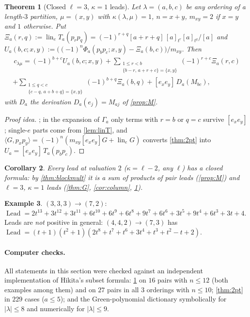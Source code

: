 \documentclass[submission]{FPSAC2027}
\newtheorem{theorem}{Theorem}[section]
\newtheorem{corollary}[theorem]{Corollary}
\theoremstyle{definition}
\newtheorem{example}[theorem]{Example}
\theoremstyle{remark}
\newcommand{\lin}{\operatorname{lin}_e}
\newcommand{\Lead}{\operatorname{Lead}}
\begin{document}
\begin{theorem}[Closed $\ell=3$, $\kappa=1$ leads]\label{thm:v2}
Let $\lambda=(a,b,c)$ be any ordering of a length-$3$ partition, $\mu=(x,y)$ with $\kappa(\lambda,\mu)=1$, $n=x+y$, $m_{xy}=2$ if $x=y$ and $1$ otherwise. Put $\Xi_a(r,q):=\lin T_a(p_rp_q)=(-1)^{r+q}[a+r+q]\,[a]_{t^r}[a]_{t^q}/[a]$ and $U_a(b,c;x,y):=\bigl((-1)^n\Phi_a(p_bp_c;x,y)-\Xi_a(b,c)\bigr)/m_{xy}$. Then
\begin{multline*}
[(s-1)^2]\,c_{\lambda\mu}=(-1)^{b+c}U_a(b,c;x,y)+\sum_{\substack{1\le r<b\\ \{b-r,\,a+r+c\}=\{x,y\}}}(-1)^{r+c}\Xi_a(r,c)\\
+\sum_{\substack{1\le q<c\\ \{c-q,\,a+b+q\}=\{x,y\}}}(-1)^{b+q}\Xi_a(b,q)+[e_xe_y]\,D_a(M_{bc}),
\end{multline*}
with $D_a$ the derivation $D_a(e_j)=M_{aj}$ of \cref{prop:M}.
\end{theorem}
\begin{proof}[Proof idea]
; in the expansion of $\Gamma_a$ only terms with $r=b$ or $q=c$ survive $[e_xe_y]$; single-$e$ parts come from \cref{lem:linT}, and $\langle G,p_xp_y\rangle=(-1)^n(m_{xy}[e_xe_y]G+\lin G)$ converts \cref{thm:2pt} into $U_a=[e_xe_y]\,T_a(p_bp_c)$.
\end{proof}
\begin{corollary}\label{cor:v2}
Every lead at valuation $2$ ($\kappa=\ell-2$, any $\ell$) has a closed formula: by \cref{thm:blockmult} it is a sum of products of pair leads (\cref{prop:M}) and $\ell=3$, $\kappa=1$ leads (\cref{thm:G}, \cref{cor:column}, \cref{thm:v2}).
\end{corollary}
\begin{example}\label{ex:v2}
$(3,3,3)\to(7,2)$: $\Lead=2t^{13}+3t^{12}+3t^{11}+6t^{10}+6t^9+6t^8+9t^7+6t^6+3t^5+9t^4+6t^3+3t+4$. Leads are \emph{not} positive in general: $(4,4,2)\to(7,3)$ has $\Lead=(t+1)(t^2+1)(2t^8+t^7+t^6+3t^4+t^3+t^2-t+2)$.
\end{example}
\paragraph{Computer checks.} All statements in this section were checked against an independent implementation of Hikita's subset formula: \cref{thm:v2} on $16$ pairs with $n\le12$ (both examples among them) and on $27$ pairs in all $3$ orderings with $n\le10$; \cref{thm:2pt} in $229$ cases ($a\le5$); and the Green-polynomial dictionary symbolically for $|\lambda|\le8$ and numerically for $|\lambda|\le9$.
\end{document}
